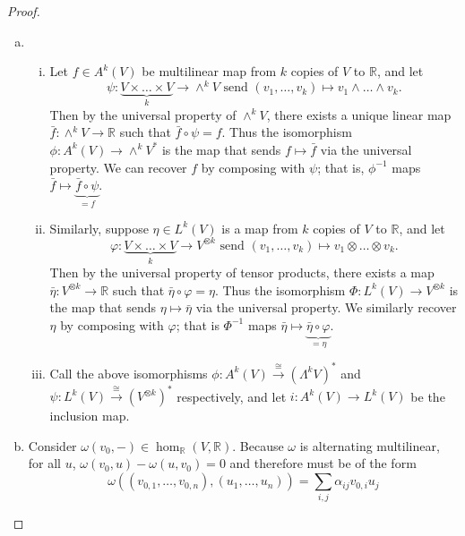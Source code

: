 \documentclass{article}
\begin{document}
\begin{proof} \text{} \\
  \begin{enumerate}[(a)]
    \item \begin{enumerate}[(i)]
      \item Let $f \in A^k(V)$ be multilinear map from $k$ copies of $V$ to $\mathbb{R}$,
      and let \[
        \psi\colon \underbrace{V \times \hdots \times V}_{k} \rightarrow \wedge^kV
        \text{ send }
        (v_1, \hdots, v_k) \mapsto v_1 \wedge \hdots \wedge v_k.
      \] Then by the
      universal property of $\wedge^kV$, there exists a unique linear map
      $\bar{f}\colon \wedge^kV \rightarrow \mathbb{R}$ such that
      $\bar{f} \circ \psi = f$. Thus the isomorphism
      $\phi\colon A^k(V) \rightarrow \wedge^kV^*$ is the map that sends
      $f \mapsto \bar{f}$ via the universal property. We can recover $f$ by
      composing with $\psi$; that is, $\phi^{-1}$ maps
      $\bar{f} \mapsto \underbrace{\bar{f} \circ \psi}_{=f}$.
      \item Similarly, suppose $\eta \in L^k(V)$ is a map from $k$ copies of $V$ to
      $\mathbb{R}$, and let \[
        \varphi\colon \underbrace{V \times \hdots \times V}_k \rightarrow V^{\otimes k}
        \text{ send }
        (v_1, \hdots, v_k) \mapsto v_1 \otimes \hdots \otimes v_k.
      \] Then by the universal property of tensor products, there exists a map
      $\bar{\eta}: V^{\otimes k} \rightarrow \mathbb{R}$ such that
      $\bar{\eta} \circ \varphi = \eta$. Thus the isomorphism
      $\Phi: L^k(V)\rightarrow V^{\otimes k}$ is the map that sends
      $\eta \mapsto \bar\eta$ via the universal property. We similarly recover
      $\eta$ by composing with $\varphi$; that is $\Phi^{-1}$ maps
      $\bar\eta \mapsto \underbrace{\bar\eta\circ\varphi}_{=\eta}$.
      \item Call the above isomorphisms
      $\phi\colon A^k(V) \xrightarrow{\cong} (\Lambda^kV)^*$ and
      $\psi\colon L^k(V) \xrightarrow{\cong} (V^{\otimes k})^*$ respectively,
      and let $i\colon A^k(V) \rightarrow L^k(V)$ be the inclusion map.
    \end{enumerate}
    \item Consider $\omega(v_0, -) \in \hom_\mathbb{R}(V, \mathbb{R})$. Because
      $\omega$ is alternating multilinear, for all $u$,
      $\omega(v_0, u) - \omega(u, v_0) = 0$ and
      therefore must be of the form \[
        \omega((v_{0,1}, \hdots, v_{0,n}), (u_{1}, \hdots, u_{n})) = \sum_{i, j} \alpha_{ij}v_{0, i}u_j
\]
\end{enumerate}
\end{proof}
\end{document}
